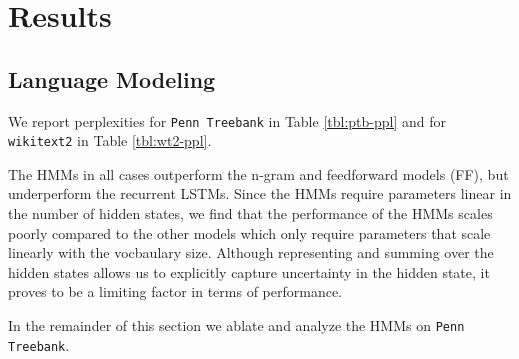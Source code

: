 \documentclass[11pt,a4paper]{article}
\begin{document}
\begin{comment}
\paragraph{Implementation}
We train two-layer LSTM recurrent neural networks with 256 units,
as well as two-layer feed-forward neural networks with 256 units.
The HMMs we train follow the sparsity constraints outlined in the previous
section with a dropout rate of 0.5,
and we vary the total number of states as well as states per word.
We optimize all models with AdamW \citep{adamw}.

We experimented with a couple batching strategies:
On \texttt{Penn Treebank},
the first strategy discarded the inter-sentence dependencies and shuffled all sentences,
and the second treated the corpus as a single flat document without shuffling.
On \texttt{Wikitext2}, we either shuffled at the document level or treated the corpus as a
single document.
Prior work on both corpuses treated the corpora as single documents.

See Appendix \ref{sec:hyperparams} for the hyperparameters for all models.
\end{comment}

\section{Results}
\subsection{Language Modeling}
We report perplexities 
for \texttt{Penn Treebank} in Table \ref{tbl:ptb-ppl} and for 
\texttt{wikitext2} in Table \ref{tbl:wt2-ppl}.

The HMMs in all cases outperform the n-gram and feedforward models (FF),
but underperform the recurrent LSTMs.
Since the HMMs require parameters linear in the number of hidden states,
we find that the performance of the HMMs scales poorly compared to the other models
which only require parameters that scale linearly with the vocbaulary size.
Although representing and summing over the hidden states
allows us to explicitly capture uncertainty in the hidden state,
it proves to be a limiting factor in terms of performance.

In the remainder of this section we ablate and analyze the HMMs on \texttt{Penn Treebank}.
\end{document}
